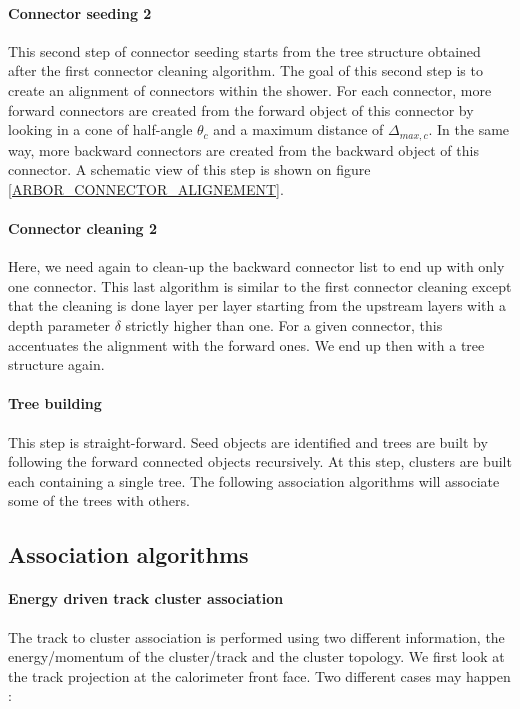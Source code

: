 \documentclass[cits]{JINST}
\begin{document}
\paragraph*{Connector seeding 2} This second step of connector seeding starts from the tree structure obtained after the first connector cleaning algorithm. The goal of this second step is to create an alignment of connectors within the shower. For each connector, more forward connectors are created from the forward object of this connector by looking in a cone of half-angle $\theta_c$ and a maximum distance of $\Delta_{max,c}$. In the same way, more backward connectors are created from the backward object of this connector. A schematic view of this step is shown on figure \ref{ARBOR_CONNECTOR_ALIGNEMENT}.

\paragraph*{Connector cleaning 2} Here, we need again to clean-up the backward connector list to end up with only one connector. This last algorithm is similar to the first connector cleaning except that the cleaning is done layer per layer starting from the upstream layers with a depth parameter $\delta$ strictly higher than one. For a given connector, this accentuates the alignment with the forward ones. We end up then with a tree structure again.

\paragraph*{Tree building} This step is straight-forward. Seed objects are identified and trees are built by following the forward connected objects recursively. At this step, clusters are built each containing a single tree. The following association algorithms will associate some of the trees with others.

\subsection{Association algorithms}

\paragraph*{Energy driven track cluster association} The track to cluster association is performed using two different information, the energy/momentum of the cluster/track and the cluster topology. We first look at the track projection at the calorimeter front face. Two different cases may happen :
\end{document}
